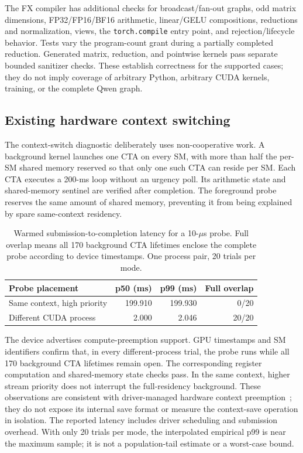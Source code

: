 The FX compiler has additional checks for broadcast/fan-out graphs, odd
matrix dimensions, FP32/FP16/BF16 arithmetic, linear/GELU compositions,
reductions and normalization, views, the \texttt{torch.compile} entry point,
and rejection/lifecycle behavior. Tests vary the program-count grant during
a partially completed reduction. Generated matrix, reduction, and pointwise
kernels pass separate bounded sanitizer checks. These establish correctness
for the supported cases; they do not imply coverage of arbitrary Python,
arbitrary CUDA kernels, training, or the complete Qwen graph.

\subsection{Existing hardware context switching}
The context-switch diagnostic deliberately uses non-cooperative work. A
background kernel launches one CTA on every SM, with more than half the
per-SM shared memory reserved so that only one such CTA can reside per SM.
Each CTA executes a 200-ms loop without an urgency poll. Its arithmetic
state and shared-memory sentinel are verified after completion. The foreground
probe reserves the same amount of shared memory, preventing it from being
explained by spare same-context residency.

\begin{table}[t]
\centering\small
\setlength{\tabcolsep}{3pt}
\begin{tabular}{lrrr}
\toprule
Probe placement & p50 (ms) & p99 (ms) & Full overlap \\
\midrule
Same context, high priority & 199.910 & 199.930 & 0/20 \\
Different CUDA process & 2.000 & 2.046 & 20/20 \\
\bottomrule
\end{tabular}
\caption{Warmed submission-to-completion latency for a 10-$\mu$s probe.
Full overlap means all 170 background CTA lifetimes enclose the complete
probe according to device timestamps. One process pair, 20 trials per mode.}
\label{tab:context}
\end{table}

The device advertises compute-preemption support. GPU timestamps and SM
identifiers confirm that, in every different-process trial, the probe runs
while all 170 background CTA lifetimes remain open. The corresponding
register computation and shared-memory state checks pass. In the same
context, higher stream priority does not interrupt the full-residency
background. These observations are consistent with driver-managed hardware
context preemption~\cite{CUDAComputePreemption}; they do not expose its
internal save format or measure the context-save operation in isolation.
The reported latency includes driver scheduling and submission overhead.
With only 20 trials per mode, the interpolated empirical p99 is near the
maximum sample; it is not a population-tail estimate or a worst-case bound.

